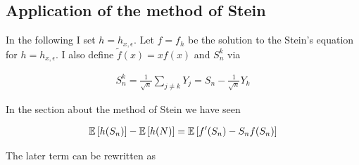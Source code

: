 \subsection{Application of the method of Stein}

In the following I set $h=h_{x,\epsilon}$. Let $f=f_h$ be the solution to the Stein's equation for $h=h_{x,\epsilon}$. I also define $\tilde f(x)=xf(x)$ and $S_n^k$ via

\begin{align}
  S_n^k = \frac 1{\sqrt{n}} \sum_{j\neq k} Y_j = S_n - \frac 1{\sqrt n} Y_k
\end{align}

\noindent In the section about the method of Stein we have seen

\begin{align}
  \mathbb E\left[{h(S_n)}\right]-\mathbb E\left[{h(N)}\right]=\mathbb E\left[{f'(S_n)-S_n f(S_n)}\right]
\end{align}

\noindent The later term can be rewritten as

